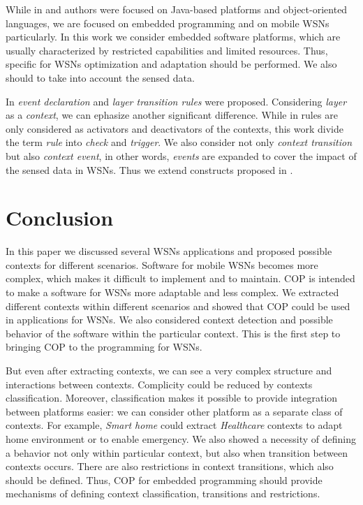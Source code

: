 \documentclass{ubicomp-ext}
\begin{document}
While in \cite{kamina11} and \cite{kamina10} authors were focused on Java-based platforms and object-oriented languages, we are focused on embedded programming and on mobile WSNs particularly. In this work we consider embedded software platforms, which are usually characterized by restricted capabilities and limited resources. Thus, specific for WSNs optimization and adaptation should be performed. We also should to take into account the sensed data.

In \cite{kamina11} \textit{event declaration} and \textit{layer transition rules} were proposed. Considering \textit{layer} as a \textit{context}, we can ephasize another significant difference. While in \cite{kamina11} rules are only considered as activators and deactivators of the contexts, this work divide the term \textit{rule} into \textit{check} and \textit{trigger}. We also consider not only \textit{context transition} but also \textit{context event}, in other words, \textit{events} are expanded to cover the impact of the sensed data in WSNs. Thus we extend constructs proposed in \cite{kamina11}.



\section{Conclusion}
In this paper we discussed several WSNs applications and proposed possible contexts for different scenarios. Software for mobile WSNs becomes more complex, which makes it difficult to implement and to maintain. COP is intended to make a software  for WSNs more adaptable and less complex. We extracted different contexts within different scenarios and showed that COP could be used in applications for WSNs. We also considered context detection and possible behavior of the software within the particular context. This is  the first step to bringing COP to the programming for WSNs.

But even after extracting contexts, we can see a very complex structure and interactions between contexts. Complicity could be reduced by contexts classification. Moreover, classification makes it possible to provide integration between platforms easier: we can consider other platform as a separate class of contexts. For example, \textit{Smart home} could extract \textit{Healthcare} contexts to adapt home environment or to enable emergency. We also showed a necessity of defining a behavior not only within particular context, but also when transition between contexts occurs. There are also restrictions in context transitions, which also should be defined. Thus, COP for embedded programming should provide mechanisms of defining context classification, transitions and restrictions.
\end{document}
